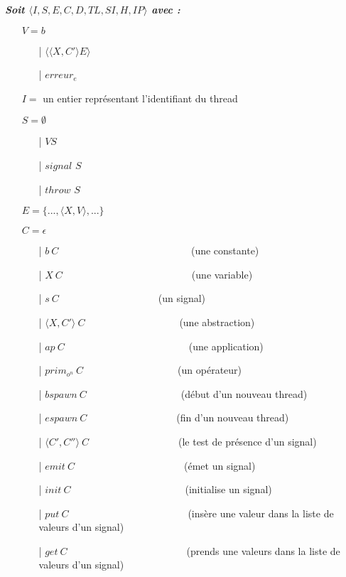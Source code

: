 \documentclass[10pt,a4paper]{report}
\begin{document}
	
	
	\textbf{\textit{Soit $\langle I,S,E,C,D,TL,SI,H,IP\rangle$ avec :}}
	
	\begin{itemize}
		\item[] $V = b$	
		\begin{itemize}
			\item[|] $\langle\langle X,C' \rangle E\rangle$
			\item[|] $erreur_{e}$
		\end{itemize}
		\item[] $I =$ un entier représentant l'identifiant du thread
		\item[] $S =  \emptyset$ 
		\begin{itemize}
			\item[|] $V S$
			\item[|] $signal$ $S$
			\item[|] $throw$ $S$
		\end{itemize}
		\item[] $E = \{...,\langle X,V\rangle,...\}$
		\item[] $C = \epsilon$
		\begin{itemize}
			\item[|] $b~C$~~~~~~~~~~~~~~~~~~~~~~~~~~    (une constante)
			\item[|] $X~C$~~~~~~~~~~~~~~~~~~~~~~~~~~(une variable)
			\item[|] $s~C$~~~~~~~~~~~~~~~~~~~~(un signal)
			\item[|] $\langle X,C'\rangle~C$~~~~~~~~~~~~~~~~~~~(une abstraction)
			\item[|] $ap~C$~~~~~~~~~~~~~~~~~~~~~~~~~(une application)
			\item[|] $prim_{o^{n}}~C$~~~~~~~~~~~~~~~~~~~(un opérateur)
			\item[|] $bspawn~C$~~~~~~~~~~~~~~~~~~~(début d'un nouveau thread)
			\item[|] $espawn~C$~~~~~~~~~~~~~~~~~~(fin d'un nouveau thread)
			\item[|] $\langle C',C''\rangle~C$~~~~~~~~~~~~~~~~~~(le test de présence d'un signal)
			\item[|] $emit~C$~~~~~~~~~~~~~~~~~~~~~~(émet un signal)
			\item[|] $init~C$~~~~~~~~~~~~~~~~~~~~~~~(initialise un signal)
			\item[|] $put~C$~~~~~~~~~~~~~~~~~~~~~~~~(insère une valeur dans la liste de valeurs d'un signal)
			\item[|] $get~C$~~~~~~~~~~~~~~~~~~~~~~~~(prends une valeurs dans la liste de valeurs d'un signal)

\end{itemize}
\end{itemize}
\end{document}
